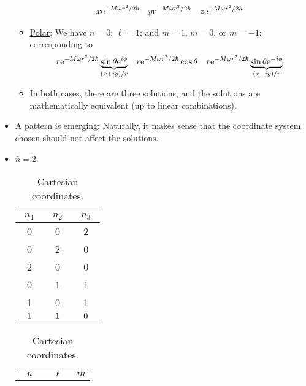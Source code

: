 \documentclass[../notes.tex]{subfiles}
\begin{document}
\begin{itemize}
\begin{itemize}
        \begin{align*}
            x\e[-M\omega r^2/2\hbar]&&
            y\e[-M\omega r^2/2\hbar]&&
            z\e[-M\omega r^2/2\hbar]
        \end{align*}
        \item \underline{Polar}: We have $n=0$; $\ell=1$; and $m=1$, $m=0$, or $m=-1$; corresponding to
        \begin{align*}
            r\e[-M\omega r^2/2\hbar]\underbrace{\sin\theta\e[i\phi]}_{(x+iy)/r}&&
            r\e[-M\omega r^2/2\hbar]\cos\theta&&
            r\e[-M\omega r^2/2\hbar]\underbrace{\sin\theta\e[-i\phi]}_{(x-iy)/r}
        \end{align*}
        \item In both cases, there are three solutions, and the solutions are mathematically equivalent (up to linear combinations).
    \end{itemize}
    \item A pattern is emerging: Naturally, it makes sense that the coordinate system chosen should not affect the solutions.
    \item $\bar{n}=2$.
    \begin{table}[h!]
        \centering
        \small
        \renewcommand{\arraystretch}{1.2}
        \begin{subtable}{0.3\linewidth}
            \centering
            \begin{tabular}{c|c|c}
                $n_1$ & $n_2$ & $n_3$\\
                \hline
                0 & 0 & 2\\
                0 & 2 & 0\\
                2 & 0 & 0\\
                0 & 1 & 1\\
                1 & 0 & 1\\
                ${\color{white}-}1{\color{white}-}$ & ${\color{white}-}1{\color{white}-}$ & ${\color{white}-}0{\color{white}-}$\\
            \end{tabular}
            \caption{Cartesian coordinates.}
            \label{tab:cartSphrHOa}
        \end{subtable}
        \begin{subtable}{0.3\linewidth}
            \centering
            \begin{tabular}{c|c|c}
                ${\color{white}-}n{\color{white}-}$ & ${\color{white}-}\ell{\color{white}-}$ & $m$\\

\end{tabular}
\end{subtable}
\end{table}
\end{itemize}
\end{document}
